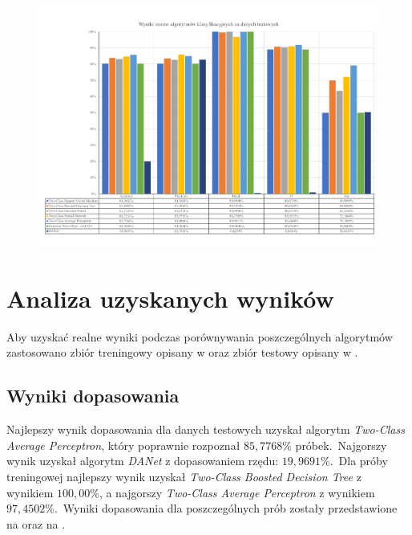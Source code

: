 \begin{landscape}
    \vspace*{\fill}
    \begin{figure}[H]
        \centering
        \includegraphics[height=0.8\textwidth]{images/predict_result}
        \label{fig:predict-result}
    \end{figure}
    \vfill
\end{landscape}


\section{Analiza uzyskanych wyników}
Aby uzyskać realne wyniki podczas porównywania poszczególnych algorytmów zastosowano zbiór treningowy opisany w  oraz zbiór testowy opisany w .

\subsection{Wyniki dopasowania}
Najlepszy wynik dopasowania dla danych testowych uzyskał algorytm \textit{Two-Class Average Perceptron}, który poprawnie rozpoznał $85,7768\%$ próbek.\ Najgorszy wynik uzyskał algorytm \textit{DANet} z dopasowaniem rzędu: $19,9691\%$.\ Dla próby treningowej najlepszy wynik uzyskał \textit{Two-Class Boosted Decision Tree} z wynikiem $100,00\%$, a najgorszy \textit{Two-Class Average Perceptron} z wynikiem $97,4502\%$.\ Wyniki dopasowania dla poszczególnych prób zostały przedstawione na  oraz na .

